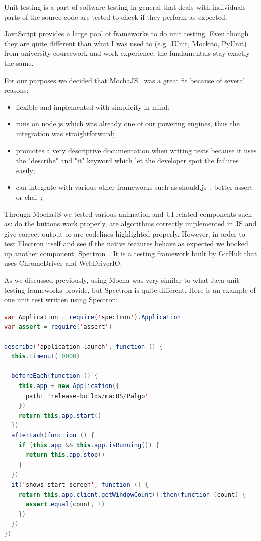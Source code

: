 \documentclass{l4proj}
\begin{document}
Unit testing is a part of software testing in general that deals with individuals parts of the source code are tested
to check if they perform as expected.

JavaScript provides a large pool of frameworks to do unit testing. Even though they are quite different than what I was
used to (e.g. JUnit, Mockito, PyUnit) from university coursework and work experience, the fundamentals stay exactly the
same.

For our purposes we decided that MochaJS~\cite{mocha} was a great fit because of several reasons:

\begin{itemize}
  \item flexible and implemented with simplicity in mind;
  \item runs on node.js which was already one of our powering engines, thus the integration was straightforward;
  \item promotes a very descriptive documentation when writing tests because it uses the "describe" and "it" keyword
    which let the developer spot the failures easily;
  \item can integrate with various other frameworks such as should.js~\cite{shouldjs},
    better-assert~\cite{better-assert} or chai~\cite{chai};
\end{itemize}

Through MochaJS we tested various animation and UI related components such as: do the buttons work properly, are
algorithms correctly implemented in JS and give correct output or are codelines highlighted properly. However, in
order to test Electron itself and see if the native features behave as expected we hooked up another component:
Spectron~\cite{spectron}. It is a testing framework built by GitHub that uses ChromeDriver and WebDriverIO. 

As we discussed previously, using Mocha was very similar to what Java unit testing frameworks provide, but Spectron is
quite different. Here is an example of one unit test written using Spectron:

\pagebreak

\begin{lstlisting}[language=Java, caption=Spectron unit test which checks correct behaviour of the Electron window.]
var Application = require('spectron').Application
var assert = require('assert')

describe('application launch', function () {
  this.timeout(10000)

  beforeEach(function () {
    this.app = new Application({
      path: 'release-builds/macOS/Palgo'
    })
    return this.app.start()
  })
  afterEach(function () {
    if (this.app && this.app.isRunning()) {
      return this.app.stop()
    }
  })
  it('shows start screen', function () {
    return this.app.client.getWindowCount().then(function (count) {
      assert.equal(count, 1)
    })
  })
})
\end{lstlisting}
\end{document}
